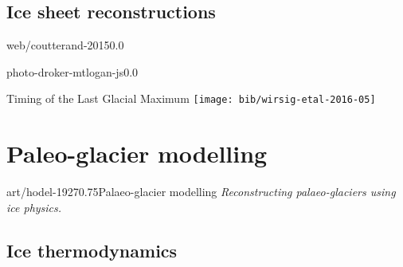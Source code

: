 \begin{CJK}{UTF8}{min}
\subsection{Ice sheet reconstructions}

    \begin{backgroundframe}[b]{web/coutterand-2015}{0.0}{}
      \flushright{}
    \end{backgroundframe}

    \begin{backgroundframe}[b]{photo-droker-mtlogan-js}{0.0}{}
      \flushleft{}
    \end{backgroundframe}

    \begin{frame}{Timing of the Last Glacial Maximum}
      \texttt{[image: bib/wirsig-etal-2016-05]}
    \end{frame}


\section{Paleo-glacier modelling}

    \begin{sectionframe}{art/hodel-1927}{0.75}{Palaeo-glacier modelling}
      \emph{Reconstructing palaeo-glaciers using ice physics.}
    \end{sectionframe}


\subsection{Ice thermodynamics}


\end{CJK}
